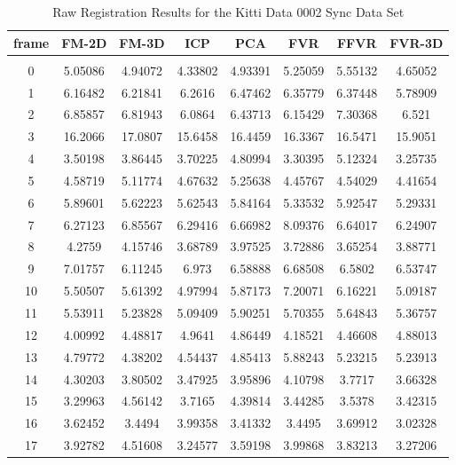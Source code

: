 
\begin{center}
\begin{longtable}{cccccccc}
\caption{Raw Registration Results for the Kitti Data 0002 Sync Data Set} \\
\label{tab:kittidata0002syncFULL}
\endfirsthead
\endhead
\textbf{frame} & \textbf{FM-2D} & \textbf{FM-3D} & \textbf{ICP} & \textbf{PCA} & \textbf{FVR} & \textbf{FFVR} & \textbf{FVR-3D} \\
\hline \\
0 & 5.05086 & 4.94072 & 4.33802 & 4.93391 & 5.25059 & 5.55132 & 4.65052\\
1 & 6.16482 & 6.21841 & 6.2616 & 6.47462 & 6.35779 & 6.37448 & 5.78909\\
2 & 6.85857 & 6.81943 & 6.0864 & 6.43713 & 6.15429 & 7.30368 & 6.521\\
3 & 16.2066 & 17.0807 & 15.6458 & 16.4459 & 16.3367 & 16.5471 & 15.9051\\
4 & 3.50198 & 3.86445 & 3.70225 & 4.80994 & 3.30395 & 5.12324 & 3.25735\\
5 & 4.58719 & 5.11774 & 4.67632 & 5.25638 & 4.45767 & 4.54029 & 4.41654\\
6 & 5.89601 & 5.62223 & 5.62543 & 5.84164 & 5.33532 & 5.92547 & 5.29331\\
7 & 6.27123 & 6.85567 & 6.29416 & 6.66982 & 8.09376 & 6.64017 & 6.24907\\
8 & 4.2759 & 4.15746 & 3.68789 & 3.97525 & 3.72886 & 3.65254 & 3.88771\\
9 & 7.01757 & 6.11245 & 6.973 & 6.58888 & 6.68508 & 6.5802 & 6.53747\\
10 & 5.50507 & 5.61392 & 4.97994 & 5.87173 & 7.20071 & 6.16221 & 5.09187\\
11 & 5.53911 & 5.23828 & 5.09409 & 5.90251 & 5.70355 & 5.64843 & 5.36757\\
12 & 4.00992 & 4.48817 & 4.9641 & 4.86449 & 4.18521 & 4.46608 & 4.88013\\
13 & 4.79772 & 4.38202 & 4.54437 & 4.85413 & 5.88243 & 5.23215 & 5.23913\\
14 & 4.30203 & 3.80502 & 3.47925 & 3.95896 & 4.10798 & 3.7717 & 3.66328\\
15 & 3.29963 & 4.56142 & 3.7165 & 4.39814 & 3.44285 & 3.5378 & 3.42315\\
16 & 3.62452 & 3.4494 & 3.99358 & 3.41332 & 3.4495 & 3.69912 & 3.02328\\
17 & 3.92782 & 4.51608 & 3.24577 & 3.59198 & 3.99868 & 3.83213 & 3.27206\\

\end{longtable}
\end{center}
